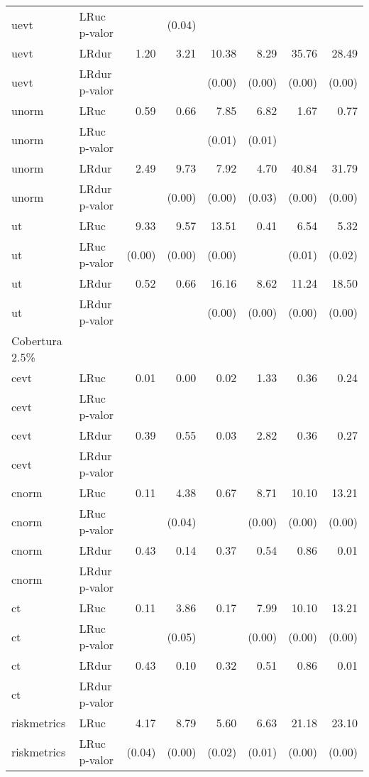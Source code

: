 \begin{longtable}{llrrrrrr}
  uevt & LRuc p-valor &  & (0.04) &  &  &  &  \\ 
  uevt & LRdur & 1.20 & 3.21 & 10.38 & 8.29 & 35.76 & 28.49 \\ 
  uevt & LRdur p-valor &  &  & (0.00) & (0.00) & (0.00) & (0.00) \\ 
  unorm & LRuc & 0.59 & 0.66 & 7.85 & 6.82 & 1.67 & 0.77 \\ 
  unorm & LRuc p-valor &  &  & (0.01) & (0.01) &  &  \\ 
  unorm & LRdur & 2.49 & 9.73 & 7.92 & 4.70 & 40.84 & 31.79 \\ 
  unorm & LRdur p-valor &  & (0.00) & (0.00) & (0.03) & (0.00) & (0.00) \\ 
  ut & LRuc & 9.33 & 9.57 & 13.51 & 0.41 & 6.54 & 5.32 \\ 
  ut & LRuc p-valor & (0.00) & (0.00) & (0.00) &  & (0.01) & (0.02) \\ 
  ut & LRdur & 0.52 & 0.66 & 16.16 & 8.62 & 11.24 & 18.50 \\ 
  ut & LRdur p-valor &  &  & (0.00) & (0.00) & (0.00) & (0.00) \\ 
  Cobertura 2.5\% &  &  &  &  &  &  &  \\ 
  cevt & LRuc & 0.01 & 0.00 & 0.02 & 1.33 & 0.36 & 0.24 \\ 
  cevt & LRuc p-valor &  &  &  &  &  &  \\ 
  cevt & LRdur & 0.39 & 0.55 & 0.03 & 2.82 & 0.36 & 0.27 \\ 
  cevt & LRdur p-valor &  &  &  &  &  &  \\ 
  cnorm & LRuc & 0.11 & 4.38 & 0.67 & 8.71 & 10.10 & 13.21 \\ 
  cnorm & LRuc p-valor &  & (0.04) &  & (0.00) & (0.00) & (0.00) \\ 
  cnorm & LRdur & 0.43 & 0.14 & 0.37 & 0.54 & 0.86 & 0.01 \\ 
  cnorm & LRdur p-valor &  &  &  &  &  &  \\ 
  ct & LRuc & 0.11 & 3.86 & 0.17 & 7.99 & 10.10 & 13.21 \\ 
  ct & LRuc p-valor &  & (0.05) &  & (0.00) & (0.00) & (0.00) \\ 
  ct & LRdur & 0.43 & 0.10 & 0.32 & 0.51 & 0.86 & 0.01 \\ 
  ct & LRdur p-valor &  &  &  &  &  &  \\ 
  riskmetrics & LRuc & 4.17 & 8.79 & 5.60 & 6.63 & 21.18 & 23.10 \\ 
  riskmetrics & LRuc p-valor & (0.04) & (0.00) & (0.02) & (0.01) & (0.00) & (0.00) \\ 

\end{longtable}
